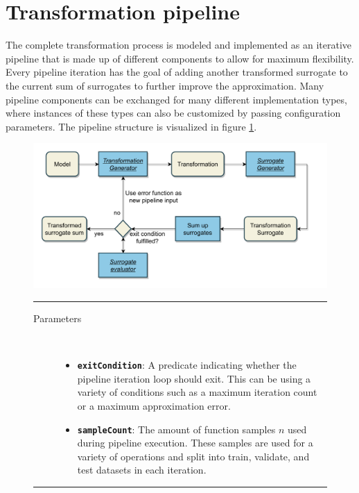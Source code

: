 \documentclass[
  a4paper,  %
  twoside,  %
  bibliography=totoc,
  headsepline,
  cleardoublepage=empty,
  parskip=half,
  draft=false
]{scrbook}
\newcommand{\delimit}{{\color{charcoal}\noindent\rule{\textwidth}{1pt}}}
\begin{document}
\newpage
\section{Transformation pipeline}
\label{sec:tp}

The complete transformation process is modeled and implemented as an iterative pipeline that is made up of different components to allow for maximum flexibility.
Every pipeline iteration has the goal of adding another transformed surrogate to the current sum of surrogates to further improve the approximation.
Many pipeline components can be exchanged for many different implementation types, where instances of these types can also be customized by passing configuration parameters.
The pipeline structure is visualized in figure \cref{fig:tp}.

\begin{mdframed}[style=style,frametitle={Transformation Pipeline}]
\begin{figure}[H]

\includegraphics[width=\textwidth]{graphics/TransformationPipeline.pdf}
\vspace{-7.5mm}

\delimit

\begin{description}
\item[Parameters] {~ \begin{itemize}[\indent{}]
\item \texttt{\textbf{exitCondition}}: A predicate indicating whether the pipeline iteration loop should exit. This can be using a variety of conditions such as a maximum iteration count or a maximum approximation error.
\item \texttt{\textbf{sampleCount}}: The amount of function samples $n$ used during pipeline execution. These samples are used for a variety of operations and split into train, validate, and test datasets in each iteration.
\end{itemize}}
\end{description}

\delimit

\label{fig:tp}
\end{figure}
\end{mdframed}
\end{document}
